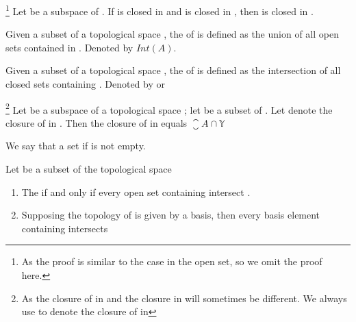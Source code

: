 \begin{theorem}\footnote{
      As the proof is similar to the case in the open set, so we omit the proof here.
}
      Let  be a subspace of . If  is closed in  and  is closed in , then  is closed in .
\end{theorem}

\begin{definition}[interior]\label{def:Interior}
      Given a subset  of a topological space , the  of  is defined as the union of all open sets contained in . Denoted by $ Int(A) $.
\end{definition}

\begin{definition}[closure]\label{def:Closure}
      Given a subset  of a topological space , the  of  is defined as the intersection of all closed sets containing . Denoted by  or 
\end{definition}

\begin{theorem}\omitObviuos\footnote{
      As the closure of  in  and the closure  in  will sometimes be different. We always use  to denote the closure of  in 
}
      Let  be a subspace of a topological space ; let  be a subset of . Let  denote the closure of  in . Then the closure of  in  equals $ \closure{A} \cap \mathbb{Y} $
\end{theorem}

\begin{definition}[intersect]\label{def:intersect}
      We say that a set    if  is not empty.
\end{definition}

\begin{theorem}
      Let  be a subset of the topological space 
      \begin{enumerate}
            \item The  if and only if every open set  containing  intersect .
            \item Supposing the topology of  is given by a basis, then  \ioi every basis element  containing  intersects 
      \end{enumerate}
\end{theorem}

